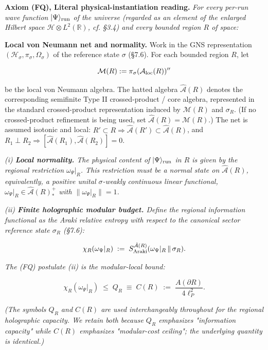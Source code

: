 \documentclass[11pt,a4paper]{article}
\begin{document}
\textbf{Axiom (FQ), Literal physical-instantiation reading.} \emph{For every per-run wave function $|\Psi\rangle_{\rm run}$ of the universe (regarded as an element of the enlarged Hilbert space $\mathcal{H} \otimes L^2(\mathbb{R})$, cf. §3.4) and every bounded region $R$ of space:}

\textbf{Local von Neumann net and normality.} Work in the GNS representation $(\mathcal{H}_\sigma, \pi_\sigma, \Omega_\sigma)$ of the reference state $\sigma$ (§7.6). For each bounded region $R$, let

\[
\mathcal{M}(R) := \pi_\sigma(\mathcal{A}_{\rm loc}(R))''
\]

be the local von Neumann algebra. The hatted algebra $\hat{\mathcal{A}}(R)$ denotes the corresponding semifinite Type II crossed-product / core algebra, represented in the standard crossed-product representation induced by $\mathcal{M}(R)$ and $\sigma_R$. (If no crossed-product refinement is being used, set $\hat{\mathcal{A}}(R) = \mathcal{M}(R)$.) The net is assumed isotonic and local: $R' \subset R \Rightarrow \hat{\mathcal{A}}(R') \subset \hat{\mathcal{A}}(R)$, and $R_1 \perp R_2 \Rightarrow [\hat{\mathcal{A}}(R_1), \hat{\mathcal{A}}(R_2)] = 0$.

\emph{(i) \textbf{Local normality.} The physical content of $|\Psi\rangle_{\rm run}$ in $R$ is given by the regional restriction $\omega_\Psi|_R$. This restriction must be a normal state on $\hat{\mathcal{A}}(R)$, equivalently, a positive unital $\sigma$-weakly continuous linear functional, $\omega_\Psi|_R \in \hat{\mathcal{A}}(R)_*^+$ with $\|\omega_\Psi|_R\| = 1$.}

\emph{(ii) \textbf{Finite holographic modular budget.} Define the regional information functional as the Araki relative entropy with respect to the canonical sector reference state $\sigma_R$ (§7.6):}

\[
\chi_R(\omega_\Psi|_R) \;:=\; S^{\hat{\mathcal{A}}(R)}_{\rm Araki}(\omega_\Psi|_R \,\|\, \sigma_R).
\]

\emph{The (FQ) postulate (ii) is the modular-local bound:}

\[
\chi_R(\omega_\Psi|_R) \;\le\; Q_R \;\equiv\; C(R) \;:=\; \frac{A(\partial R)}{4\ell_P^2}.
\]

\emph{(The symbols $Q_R$ and $C(R)$ are used interchangeably throughout for the regional holographic capacity. We retain both because $Q_R$ emphasizes "information capacity" while $C(R)$ emphasizes "modular-cost ceiling"; the underlying quantity is identical.)}
\end{document}
